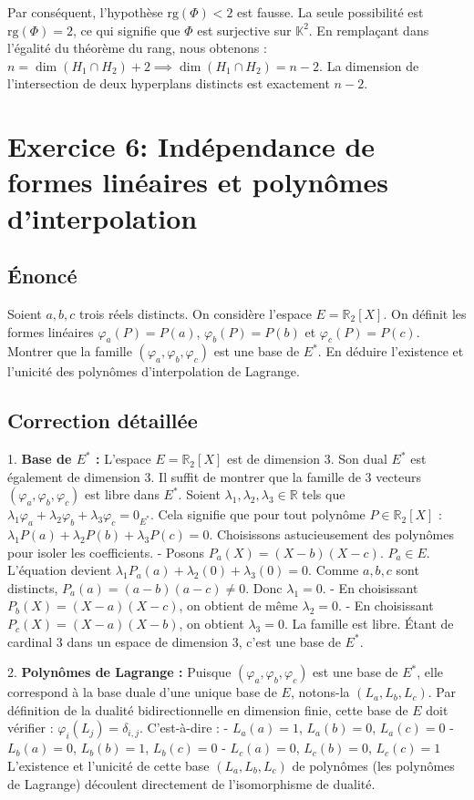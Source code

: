 \documentclass{report}
\begin{document}
Par conséquent, l'hypothèse $\text{rg}(\Phi) < 2$ est fausse. La seule possibilité est $\text{rg}(\Phi) = 2$, ce qui signifie que $\Phi$ est surjective sur $\mathbb{K}^2$.
En remplaçant dans l'égalité du théorème du rang, nous obtenons :
$n = \dim(H_1 \cap H_2) + 2 \implies \dim(H_1 \cap H_2) = n - 2$.
La dimension de l'intersection de deux hyperplans distincts est exactement $n - 2$.


\newpage
\chapter*{Exercice 6: Indépendance de formes linéaires et polynômes d'interpolation}
\section*{Énoncé}
Soient $a, b, c$ trois réels distincts. On considère l'espace $E = \mathbb{R}_2[X]$.
On définit les formes linéaires $\varphi_a(P) = P(a)$, $\varphi_b(P) = P(b)$ et $\varphi_c(P) = P(c)$.
Montrer que la famille $(\varphi_a, \varphi_b, \varphi_c)$ est une base de $E^*$. En déduire l'existence et l'unicité des polynômes d'interpolation de Lagrange.


\section*{Correction détaillée}
1. \textbf{Base de $E^*$ :}
   L'espace $E = \mathbb{R}_2[X]$ est de dimension 3. Son dual $E^*$ est également de dimension 3.
   Il suffit de montrer que la famille de 3 vecteurs $(\varphi_a, \varphi_b, \varphi_c)$ est libre dans $E^*$.
   Soient $\lambda_1, \lambda_2, \lambda_3 \in \mathbb{R}$ tels que $\lambda_1 \varphi_a + \lambda_2 \varphi_b + \lambda_3 \varphi_c = 0_{E^*}$.
   Cela signifie que pour tout polynôme $P \in \mathbb{R}_2[X]$ :
   $\lambda_1 P(a) + \lambda_2 P(b) + \lambda_3 P(c) = 0$.
   Choisissons astucieusement des polynômes pour isoler les coefficients.
   - Posons $P_a(X) = (X-b)(X-c)$. $P_a \in E$.
     L'équation devient $\lambda_1 P_a(a) + \lambda_2(0) + \lambda_3(0) = 0$.
     Comme $a, b, c$ sont distincts, $P_a(a) = (a-b)(a-c) \neq 0$.
     Donc $\lambda_1 = 0$.
   - En choisissant $P_b(X) = (X-a)(X-c)$, on obtient de même $\lambda_2 = 0$.
   - En choisissant $P_c(X) = (X-a)(X-b)$, on obtient $\lambda_3 = 0$.
   La famille est libre. Étant de cardinal 3 dans un espace de dimension 3, c'est une base de $E^*$.

2. \textbf{Polynômes de Lagrange :}
   Puisque $(\varphi_a, \varphi_b, \varphi_c)$ est une base de $E^*$, elle correspond à la base duale d'une unique base de $E$, notons-la $(L_a, L_b, L_c)$.
   Par définition de la dualité bidirectionnelle en dimension finie, cette base de $E$ doit vérifier :
   $\varphi_i(L_j) = \delta_{i,j}$.
   C'est-à-dire :
   - $L_a(a) = 1$, $L_a(b) = 0$, $L_a(c) = 0$
   - $L_b(a) = 0$, $L_b(b) = 1$, $L_b(c) = 0$
   - $L_c(a) = 0$, $L_c(b) = 0$, $L_c(c) = 1$
   L'existence et l'unicité de cette base $(L_a, L_b, L_c)$ de polynômes (les polynômes de Lagrange) découlent directement de l'isomorphisme de dualité.
\end{document}
